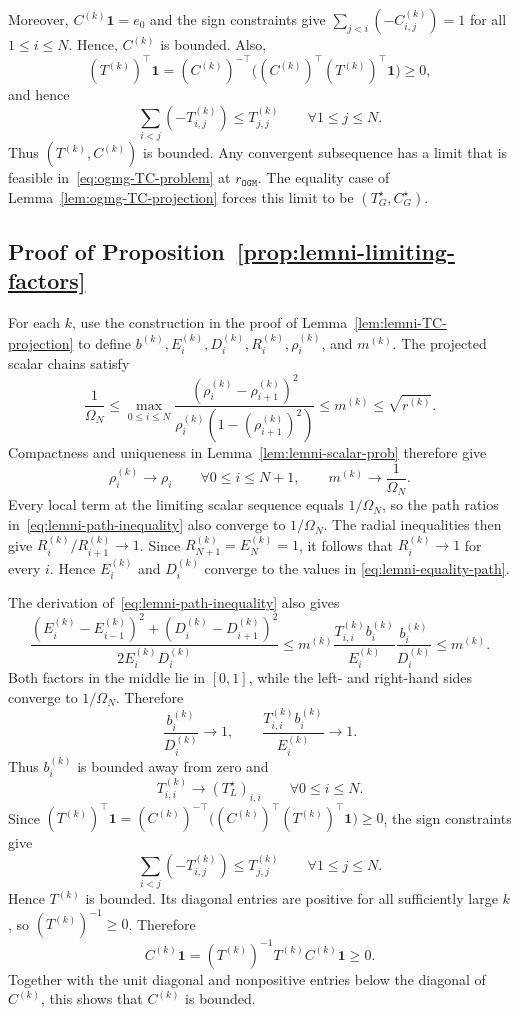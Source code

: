 \documentclass[11pt]{article}
\begin{document}
Moreover, $C^{(k)}\mathbf1=e_0$ and the sign constraints give $\sum_{j<i}(-C_{i,j}^{(k)})=1$ for all $1\leq i\leq N$. Hence, $C^{(k)}$ is bounded. Also,
\[
    (T^{(k)})^\top\mathbf1
    =(C^{(k)})^{-\top}
      \bigl((C^{(k)})^\top(T^{(k)})^\top\mathbf1\bigr)
    \geq0,
\]
and hence
\[
    \sum_{i<j}(-T_{i,j}^{(k)})
    \leq T_{j,j}^{(k)}
    \qquad \forall 1\leq j\leq N.
\]
Thus $(T^{(k)},C^{(k)})$ is bounded. Any convergent subsequence has a limit
that is feasible in~\eqref{eq:ogmg-TC-problem} at $r_\mathtt{OGM}$. The
equality case of Lemma~\ref{lem:ogmg-TC-projection} forces this limit to be
$(T_G^\star,C_G^\star)$.

\subsection{Proof of Proposition~\ref{prop:lemni-limiting-factors}}
For each $k$, use the construction in the proof of
Lemma~\ref{lem:lemni-TC-projection} to define
$b^{(k)},E_i^{(k)},D_i^{(k)},R_i^{(k)},\rho_i^{(k)}$, and $m^{(k)}$. The
projected scalar chains satisfy
\[
    \frac1{\Omega_N}
    \leq
    \max_{0\leq i\leq N}
    \frac{(\rho_i^{(k)}-\rho_{i+1}^{(k)})^2}
    {\rho_i^{(k)}(1-(\rho_{i+1}^{(k)})^2)}
    \leq m^{(k)}\leq\sqrt{r^{(k)}}.
\]
Compactness and uniqueness in Lemma~\ref{lem:lemni-scalar-prob} therefore give
\[
    \rho_i^{(k)}\to\rho_i
    \qquad \forall 0\leq i\leq N+1,
    \qquad
    m^{(k)}\to\frac1{\Omega_N}.
\]
Every local term at the limiting scalar sequence equals $1/\Omega_N$, so the
path ratios in~\eqref{eq:lemni-path-inequality} also converge to
$1/\Omega_N$. The radial inequalities then give
$R_i^{(k)}/R_{i+1}^{(k)}\to1$. Since
$R_{N+1}^{(k)}=E_N^{(k)}=1$, it follows that $R_i^{(k)}\to1$ for every $i$.
Hence $E_i^{(k)}$ and $D_i^{(k)}$ converge to the values in
\eqref{eq:lemni-equality-path}.

The derivation of~\eqref{eq:lemni-path-inequality} also gives
\[
\frac{(E_i^{(k)}-E_{i-1}^{(k)})^2
 +(D_i^{(k)}-D_{i+1}^{(k)})^2}
 {2E_i^{(k)}D_i^{(k)}}
\leq
m^{(k)}
\frac{T_{i,i}^{(k)}b_i^{(k)}}{E_i^{(k)}}
\frac{b_i^{(k)}}{D_i^{(k)}}
\leq m^{(k)}.
\]
Both factors in the middle lie in $[0,1]$, while the left- and right-hand
sides converge to $1/\Omega_N$. Therefore
\[
    \frac{b_i^{(k)}}{D_i^{(k)}}\to1,
    \qquad
    \frac{T_{i,i}^{(k)}b_i^{(k)}}{E_i^{(k)}}\to1.
\]
Thus $b_i^{(k)}$ is bounded away from zero and
\[
    T_{i,i}^{(k)}\to(T_L^\star)_{i,i}
    \qquad \forall 0\leq i\leq N.
\]
Since $(T^{(k)})^\top\mathbf1
    =(C^{(k)})^{-\top}
      \bigl((C^{(k)})^\top(T^{(k)})^\top\mathbf1\bigr)
    \geq0$,
the sign constraints give
\[
    \sum_{i<j}(-T_{i,j}^{(k)})
    \leq T_{j,j}^{(k)}
    \qquad \forall 1\leq j\leq N.
\]
Hence $T^{(k)}$ is bounded. Its diagonal entries are positive for
all sufficiently large $k$, so $(T^{(k)})^{-1}\geq0$. Therefore
\[
    C^{(k)}\mathbf1
    =(T^{(k)})^{-1}
      T^{(k)}C^{(k)}\mathbf1
    \geq0.
\]
Together with the unit diagonal and nonpositive entries below the diagonal of
$C^{(k)}$, this shows that $C^{(k)}$ is bounded.
\end{document}
